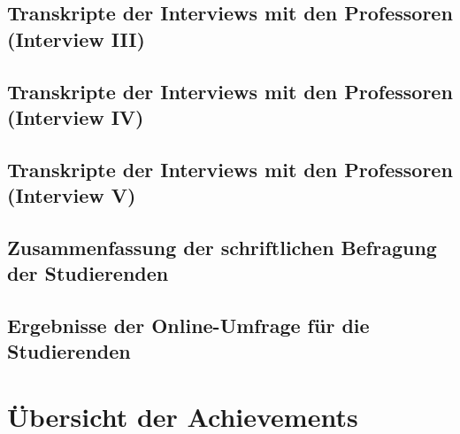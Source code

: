\documentclass[bibliography=totoc,listof=totoc,BCOR=5mm,DIV=12,oneside]{scrbook}
\begin{document}
{\subsection{Transkripte der Interviews mit den Professoren (Interview III)}
\label{anhang:interviewProfessorenTranskripteInterviewI}


\subsection{Transkripte der Interviews mit den Professoren (Interview IV)}
\label{anhang:interviewProfessorenTranskripteInterviewI}


\subsection{Transkripte der Interviews mit den Professoren (Interview V)}
\label{anhang:interviewProfessorenTranskripteInterviewI}


\newpage
\subsection{Zusammenfassung der schriftlichen Befragung der Studierenden}
\label{anhang:schriftlicheBefragungStudierendeZusammenfassung}


\subsection{Ergebnisse der Online-Umfrage für die Studierenden}
\label{anhang:onlineUmfrageStudierendeErgebnisse}


\section{Übersicht der Achievements}
\label{anhang:achievementuebersicht}


}
\end{document}
